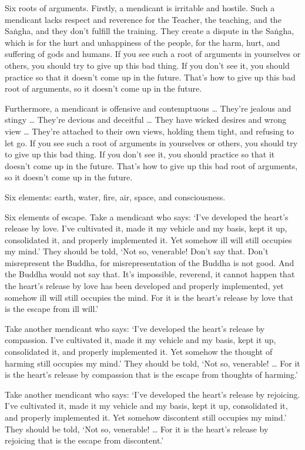 \documentclass[12pt,openany]{book}%
\begin{document}
Six roots of arguments. Firstly, a mendicant is irritable and hostile. Such a mendicant lacks respect and reverence for the Teacher, the teaching, and the \textsanskrit{Saṅgha}, and they don’t fulfill the training. They create a dispute in the \textsanskrit{Saṅgha}, which is for the hurt and unhappiness of the people, for the harm, hurt, and suffering of gods and humans. If you see such a root of arguments in yourselves or others, you should try to give up this bad thing. If you don’t see it, you should practice so that it doesn’t come up in the future. That’s how to give up this bad root of arguments, so it doesn’t come up in the future. 

Furthermore, a mendicant is offensive and contemptuous … They’re jealous and stingy … They’re devious and deceitful … They have wicked desires and wrong view … They’re attached to their own views, holding them tight, and refusing to let go. If you see such a root of arguments in yourselves or others, you should try to give up this bad thing. If you don’t see it, you should practice so that it doesn’t come up in the future. That’s how to give up this bad root of arguments, so it doesn’t come up in the future. 

Six elements: earth, water, fire, air, space, and consciousness. 

Six elements of escape. Take a mendicant who says: ‘I’ve developed the heart’s release by love. I’ve cultivated it, made it my vehicle and my basis, kept it up, consolidated it, and properly implemented it. Yet somehow ill will still occupies my mind.’ They should be told, ‘Not so, venerable! Don’t say that. Don’t misrepresent the Buddha, for misrepresentation of the Buddha is not good. And the Buddha would not say that. It’s impossible, reverend, it cannot happen that the heart’s release by love has been developed and properly implemented, yet somehow ill will still occupies the mind. For it is the heart’s release by love that is the escape from ill will.’ 

Take another mendicant who says: ‘I’ve developed the heart’s release by compassion. I’ve cultivated it, made it my vehicle and my basis, kept it up, consolidated it, and properly implemented it. Yet somehow the thought of harming still occupies my mind.’ They should be told, ‘Not so, venerable! … For it is the heart’s release by compassion that is the escape from thoughts of harming.’ 

Take another mendicant who says: ‘I’ve developed the heart’s release by rejoicing. I’ve cultivated it, made it my vehicle and my basis, kept it up, consolidated it, and properly implemented it. Yet somehow discontent still occupies my mind.’ They should be told, ‘Not so, venerable! … For it is the heart’s release by rejoicing that is the escape from discontent.’ 
\end{document}
